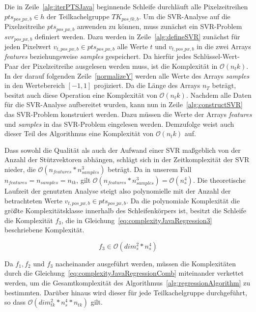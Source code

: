 Die in Zeile~\ref{alg:iterPTSJava} beginnende Schleife durchläuft alle Pixelzeitreihen $pts_{pos\_px, b} \in h$ der Teilkachelgruppe $TK_{pos\_tk, b}$. Um die SVR-Analyse auf die Pixelzeitreihe $pts_{pos\_px, b}$ anwenden zu können, muss zunächst ein SVR-Problem $svr_{pos\_{px}, b}$ definiert werden. Dazu werden in Zeile~\ref{alg:defineSVR} zunächst für jeden Pixelwert $v_{t, pos\_px, b} \in pts_{pos\_px, b}$ alle Werte $t$ und $v_{t, pos\_px, b}$ in die zwei Arrays \textit{features} beziehungsweise \textit{samples} gespeichert. Da hierfür jedes Schlüssel-Wert-Paar der Pixelzeitreihe ausgelesen werden muss, ist die Komplexität in $\mathcal{O}(n_tk)$. In der darauf folgenden Zeile~\ref{normalizeY} werden alle Werte des Arrays \textit{samples } in den Wertebereich $[-1, 1]$ projiziert. Da die Länge des Arrays $n_T$ beträgt, besitzt auch diese Operation eine Komplexität von $\mathcal{O}(n_tk)$. Nachdem alle Daten für die SVR-Analyse aufbereitet wurden, kann nun in Zeile~\ref{alg:constructSVR} das SVR-Problem konstruiert werden. Dazu müssen die Werte der Arrays \textit{features} und \textit{samples} in das SVR-Problem eingelesen werden. Demzufolge weist auch dieser Teil des Algorithmus eine Komplexität von $\mathcal{O}(n_tk)$ auf.

Dass sowohl die Qualität als auch der Aufwand einer SVR maßgeblich von der Anzahl der Stützvektoren abhängen, schlägt sich in der Zeitkomplexität der SVR nieder, die $\mathcal{O}(n_{features} * n_{samples}^3)$ beträgt. Da in unserem Fall $n_{features} = n_{samples} = n_{tk}$, gilt $\mathcal{O}(n_{features} * n_{samples}^3) = \mathcal{O}(n_{s}^4)$. Die theoretische Laufzeit der genutzten Analyse steigt also polynomielle mit der Anzahl der betrachteten Werte  $v_{t, pos\_px, b} \in pts_{pos\_px, b}$. Da die polynomiale Komplexität die größte Komplexitätsklasse innerhalb des Schleifenkörpers ist, besitzt die Schleife die Komplexität $f_3$, die in Gleichung~\ref{eq:complexityJavaRegression3} beschriebene Komplexität.

\begin{equation} \label{eq:complexityJavaRegression3}
f_3 \in \mathcal{O}(dim_{s}^2 * n_{s}^4)
\end{equation}

Da $f_1, f_2$ und $f_3$ nacheinander ausgeführt werden, müssen die Komplexitäten durch die Gleichung~\ref{eq:complexityJavaRegressionComb} miteinander verkettet werden, um die Gesamtkomplexität des Algorithmus~\ref{alg:regressionAlgorithm} zu bestimmten. Darüber hinaus wird dieser für jede Teilkachelgruppe durchgeführt, so dass $\mathcal{O}(dim_{tk}^2 * n_{s}^4 * n_{tk})$ gilt.

